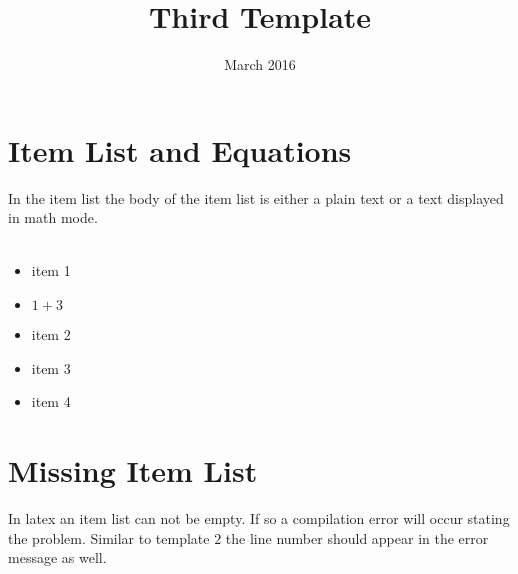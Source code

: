 \documentclass{article}
\begin{document}
\title{Third Template}
\date{March 2016}
\maketitle

\section{Item List and Equations}
In the item list the body of the item list is either a plain text or a text displayed in math mode. \\
\\
\begin{itemize}
\item item 1
\item $1+3$
\item item $2$
\item item 3
\item item 4
\end{itemize}



\section{Missing Item List}
In latex an item list can not be empty. If so a compilation error will occur stating the problem. Similar to template $2$ the line number should appear in the error message as well.

\begin{itemize}

\end{itemize}
\end{document}
